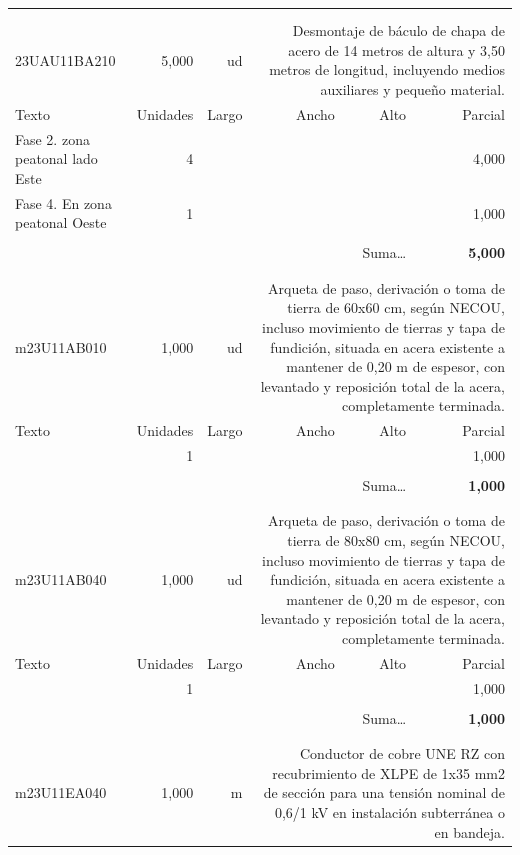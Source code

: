 \documentclass{book}%
\begin{document}
\begin{longtable}{lrrrrr}
\hline%
&&&&&\\%
&&&&&\\%
23UAU11BA210&     5,000& ud&\multicolumn{3}{p{6cm}}{\scriptsize Desmontaje de báculo de chapa de acero de 14 metros de altura y 3,50 metros de longitud, incluyendo medios auxiliares y pequeño material.\normalsize}\\%
Texto&Unidades&Largo&Ancho&Alto&Parcial\\%
\hline%
\multicolumn{1}{p{3.5cm}}{Fase 2.  zona peatonal lado Este}&4&&&&     4,000\\%
\multicolumn{1}{p{3.5cm}}{Fase 4. En zona peatonal Oeste }&1&&&&     1,000\\%
&&&&&\\%
\multicolumn{5}{r}{Suma\ldots}&\textbf{     5,000}\\%
\hline%
&&&&&\\%
&&&&&\\%
m23U11AB010&     1,000& ud&\multicolumn{3}{p{6cm}}{\scriptsize Arqueta de paso, derivación o toma de tierra de 60x60 cm, según NECOU, incluso movimiento de tierras y tapa de fundición, situada en acera existente a mantener de 0,20 m de espesor, con levantado y reposición total de la acera, completamente terminada.\normalsize}\\%
Texto&Unidades&Largo&Ancho&Alto&Parcial\\%
\hline%
\multicolumn{1}{p{3.5cm}}{ }&1&&&&     1,000\\%
&&&&&\\%
\multicolumn{5}{r}{Suma\ldots}&\textbf{     1,000}\\%
\hline%
&&&&&\\%
&&&&&\\%
m23U11AB040&     1,000& ud&\multicolumn{3}{p{6cm}}{\scriptsize Arqueta de paso, derivación o toma de tierra de 80x80 cm, según NECOU, incluso movimiento de tierras y tapa de fundición, situada en acera existente a mantener de 0,20 m de espesor, con levantado y reposición total de la acera, completamente terminada.\normalsize}\\%
Texto&Unidades&Largo&Ancho&Alto&Parcial\\%
\hline%
\multicolumn{1}{p{3.5cm}}{ }&1&&&&     1,000\\%
&&&&&\\%
\multicolumn{5}{r}{Suma\ldots}&\textbf{     1,000}\\%
\hline%
&&&&&\\%
&&&&&\\%
m23U11EA040&     1,000& m&\multicolumn{3}{p{6cm}}{\scriptsize Conductor de cobre UNE RZ con recubrimiento de XLPE de 1x35 mm2 de sección para una tensión nominal de 0,6/1 kV en instalación subterránea o en bandeja.\normalsize}\\%

\end{longtable}
\end{document}
